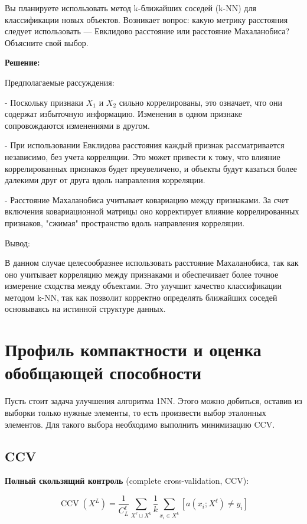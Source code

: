 Вы планируете использовать метод k-ближайших соседей (k-NN) для классификации новых объектов. Возникает вопрос: какую метрику расстояния следует использовать — Евклидово расстояние или расстояние Махаланобиса? Объясните свой выбор.

\textbf{Решение:}

Предполагаемые рассуждения:

  - Поскольку признаки \( X_1 \) и \( X_2 \) сильно коррелированы, это означает, что они содержат избыточную информацию. Изменения в одном признаке сопровождаются изменениями в другом.

- При использовании Евклидова расстояния каждый признак рассматривается независимо, без учета корреляции. Это может привести к тому, что влияние коррелированных признаков будет преувеличено, и объекты будут казаться более далекими друг от друга вдоль направления корреляции.

- Расстояние Махаланобиса учитывает ковариацию между признаками. За счет включения ковариационной матрицы оно корректирует влияние коррелированных признаков, "сжимая" пространство вдоль направления корреляции.

Вывод:

В данном случае целесообразнее использовать расстояние Махаланобиса, так как оно учитывает корреляцию между признаками и обеспечивает более точное измерение сходства между объектами. Это улучшит качество классификации методом k-NN, так как позволит корректно определять ближайших соседей основываясь на истинной структуре данных.


\newpage

\section{Профиль компактности и оценка обобщающей способности}

Пусть стоит задача улучшения алгоритма 1NN. Этого можно добиться, оставив из выборки только нужные  элементы, то есть произвести выбор эталонных элементов. Для такого выбора необходимо выполнить минимизацию CCV.


\subsection{CCV}

\noindent
\textbf{Полный скользящий контроль}  (complete cross-validation, CCV):

\begin{equation*}
	\operatorname{CCV}\left(X^L\right)=\frac{1}{C_L^{\ell}} \sum_{X^{\ell} \sqcup X^k} \frac{1}{k} \sum_{x_i \in X^k}\left[a\left(x_i ; X^{\ell}\right) \neq y_i\right]
\end{equation*}


